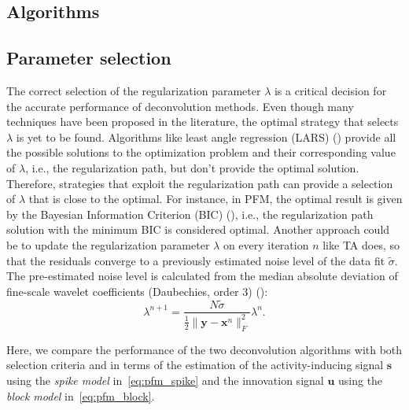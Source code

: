 \subsection{Algorithms}

\subsection{Parameter selection}
\label{sec:regparam}

The correct selection of the regularization parameter \(\lambda\) is a critical decision for the accurate performance of deconvolution methods. Even though many techniques have been proposed in the literature, the optimal strategy that selects \(\lambda\) is yet to be found. Algorithms like least angle regression (LARS) (\citealt{efron2004LeastAngleRegression}) provide all the possible solutions to the optimization problem and their corresponding value of \(\lambda\), i.e., the regularization path, but don't provide the optimal solution. Therefore, strategies that exploit the regularization path can provide a selection of \(\lambda\) that is close to the optimal. For instance, in PFM, the optimal result is given by the Bayesian Information Criterion (BIC) (\citealt{schwarz1978EstimatingDimensionModel}), i.e., the regularization path solution with the minimum BIC is considered optimal. Another approach could be to update the regularization parameter \(\lambda\) on every iteration \(n\) like TA does, so that the residuals converge to a previously estimated noise level of the data fit \(\tilde{\sigma}\). The pre-estimated noise level is calculated from the median absolute deviation of fine-scale wavelet coefficients (Daubechies, order 3) (\citealt{karahanoglu2013TotalActivationFMRI}):
\begin{equation}
    \lambda^{n+1} = \frac{N \tilde{\sigma}}{\frac{1}{2} \| \mathbf{y} - \mathbf{x}^n \|_F^2} \lambda^n.
\label{eq:std}
\end{equation}

Here, we compare the performance of the two deconvolution algorithms with both selection criteria and in terms of the estimation of the activity-inducing signal \(\mathbf{s}\) using the \textit{spike model} in~\eqref{eq:pfm_spike} and the innovation signal \(\mathbf{u}\) using the \textit{block model} in~\eqref{eq:pfm_block}.